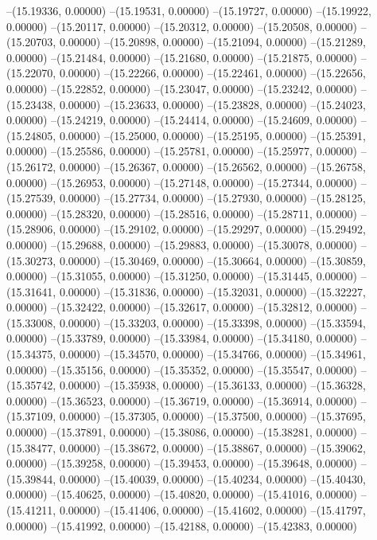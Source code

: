 --(15.19336, 0.00000)
--(15.19531, 0.00000)
--(15.19727, 0.00000)
--(15.19922, 0.00000)
--(15.20117, 0.00000)
--(15.20312, 0.00000)
--(15.20508, 0.00000)
--(15.20703, 0.00000)
--(15.20898, 0.00000)
--(15.21094, 0.00000)
--(15.21289, 0.00000)
--(15.21484, 0.00000)
--(15.21680, 0.00000)
--(15.21875, 0.00000)
--(15.22070, 0.00000)
--(15.22266, 0.00000)
--(15.22461, 0.00000)
--(15.22656, 0.00000)
--(15.22852, 0.00000)
--(15.23047, 0.00000)
--(15.23242, 0.00000)
--(15.23438, 0.00000)
--(15.23633, 0.00000)
--(15.23828, 0.00000)
--(15.24023, 0.00000)
--(15.24219, 0.00000)
--(15.24414, 0.00000)
--(15.24609, 0.00000)
--(15.24805, 0.00000)
--(15.25000, 0.00000)
--(15.25195, 0.00000)
--(15.25391, 0.00000)
--(15.25586, 0.00000)
--(15.25781, 0.00000)
--(15.25977, 0.00000)
--(15.26172, 0.00000)
--(15.26367, 0.00000)
--(15.26562, 0.00000)
--(15.26758, 0.00000)
--(15.26953, 0.00000)
--(15.27148, 0.00000)
--(15.27344, 0.00000)
--(15.27539, 0.00000)
--(15.27734, 0.00000)
--(15.27930, 0.00000)
--(15.28125, 0.00000)
--(15.28320, 0.00000)
--(15.28516, 0.00000)
--(15.28711, 0.00000)
--(15.28906, 0.00000)
--(15.29102, 0.00000)
--(15.29297, 0.00000)
--(15.29492, 0.00000)
--(15.29688, 0.00000)
--(15.29883, 0.00000)
--(15.30078, 0.00000)
--(15.30273, 0.00000)
--(15.30469, 0.00000)
--(15.30664, 0.00000)
--(15.30859, 0.00000)
--(15.31055, 0.00000)
--(15.31250, 0.00000)
--(15.31445, 0.00000)
--(15.31641, 0.00000)
--(15.31836, 0.00000)
--(15.32031, 0.00000)
--(15.32227, 0.00000)
--(15.32422, 0.00000)
--(15.32617, 0.00000)
--(15.32812, 0.00000)
--(15.33008, 0.00000)
--(15.33203, 0.00000)
--(15.33398, 0.00000)
--(15.33594, 0.00000)
--(15.33789, 0.00000)
--(15.33984, 0.00000)
--(15.34180, 0.00000)
--(15.34375, 0.00000)
--(15.34570, 0.00000)
--(15.34766, 0.00000)
--(15.34961, 0.00000)
--(15.35156, 0.00000)
--(15.35352, 0.00000)
--(15.35547, 0.00000)
--(15.35742, 0.00000)
--(15.35938, 0.00000)
--(15.36133, 0.00000)
--(15.36328, 0.00000)
--(15.36523, 0.00000)
--(15.36719, 0.00000)
--(15.36914, 0.00000)
--(15.37109, 0.00000)
--(15.37305, 0.00000)
--(15.37500, 0.00000)
--(15.37695, 0.00000)
--(15.37891, 0.00000)
--(15.38086, 0.00000)
--(15.38281, 0.00000)
--(15.38477, 0.00000)
--(15.38672, 0.00000)
--(15.38867, 0.00000)
--(15.39062, 0.00000)
--(15.39258, 0.00000)
--(15.39453, 0.00000)
--(15.39648, 0.00000)
--(15.39844, 0.00000)
--(15.40039, 0.00000)
--(15.40234, 0.00000)
--(15.40430, 0.00000)
--(15.40625, 0.00000)
--(15.40820, 0.00000)
--(15.41016, 0.00000)
--(15.41211, 0.00000)
--(15.41406, 0.00000)
--(15.41602, 0.00000)
--(15.41797, 0.00000)
--(15.41992, 0.00000)
--(15.42188, 0.00000)
--(15.42383, 0.00000)
